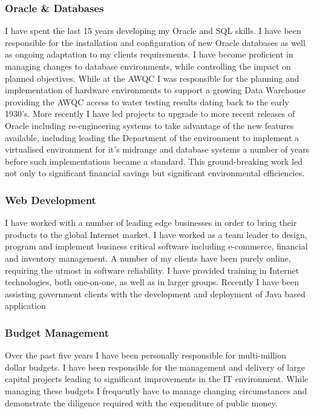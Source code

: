 \documentclass[]{friggeri-cv} %
\begin{document}
\subsubsection*{Oracle \& Databases}
I have spent the last 15 years developing my Oracle and SQL skills. I have been responsible for the installation and configuration of new Oracle databases as well as ongoing adaptation to my clients requirements. I have become proficient in managing changes to database environments, while controlling the impact on planned objectives. While at the AWQC I was responsible for the planning and implementation of hardware environments to support a growing Data Warehouse providing the AWQC access to water testing results dating back to the early 1930’s. More recently I have led projects to upgrade to more recent releases of Oracle including re-engineering systems to take advantage of the new features available, including leading the Department of the environment to implement a virtualised environment for it's midrange and database systems a number of years before such implementations became a standard. This ground-breaking work led not only to significant financial savings but significant environmental efficiencies.

\subsubsection*{Web Development}
I have worked with a number of leading edge businesses in order to bring their products to the global Internet market. I have worked as a team leader to design, program and implement business critical software including e-commerce, financial and inventory management. A number of my clients have been purely online, requiring the utmost in software reliability. I have provided training in Internet technologies, both one-on-one, as well as in larger groups. Recently I have been assisting government clients with the development and deployment of Java based application

\subsubsection*{Budget Management}
Over the past five years I have been personally responsible for multi-million dollar budgets. I have been responsible for the management and delivery of large capital projects leading to significant improvements in the IT environment. While managing these budgets I frequently have to manage changing circumstances and demonstrate the diligence required with the expenditure of public money.
\end{document}
